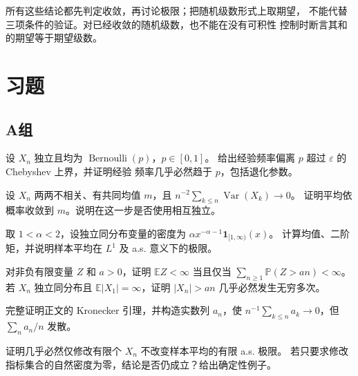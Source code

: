 所有这些结论都先判定收敛，再讨论极限；把随机级数形式上取期望，
不能代替三项条件的验证。对已经收敛的随机级数，也不能在没有可积性
控制时断言其和的期望等于期望级数。

\section*{习题}
\subsection*{A组}
\begin{enumerate}[label=\textbf{\thechapter.\arabic*.}]
设 $X_n$ 独立且均为 $\operatorname{Bernoulli}(p)$，$p\in[0,1]$。
给出经验频率偏离 $p$ 超过 $\varepsilon$ 的 Chebyshev 上界，并证明经验
频率几乎必然趋于 $p$，包括退化参数。

设 $X_n$ 两两不相关、有共同均值 $m$，且
$n^{-2}\sum_{k\le n}\operatorname{Var}(X_k)\to0$。
证明平均依概率收敛到 $m$。说明在这一步是否使用相互独立。

取 $1<\alpha<2$，设独立同分布变量的密度为
$\alpha x^{-\alpha-1}\mathbf1_{[1,\infty)}(x)$。
计算均值、二阶矩，并说明样本平均在 $L^1$ 及 a.s. 意义下的极限。

对非负有限变量 $Z$ 和 $a>0$，证明
$\mathbb EZ<\infty$ 当且仅当 $\sum_{n\ge1}\mathbb P(Z>an)<\infty$。
若 $X_n$ 独立同分布且 $\mathbb E|X_1|=\infty$，证明
$|X_n|>an$ 几乎必然发生无穷多次。

完整证明正文的 Kronecker 引理，并构造实数列 $a_n$，使
$n^{-1}\sum_{k\le n}a_k\to0$，但 $\sum_na_n/n$ 发散。

证明几乎必然仅修改有限个 $X_n$ 不改变样本平均的有限 a.s. 极限。
若只要求修改指标集合的自然密度为零，结论是否仍成立？给出确定性例子。
\end{enumerate}

